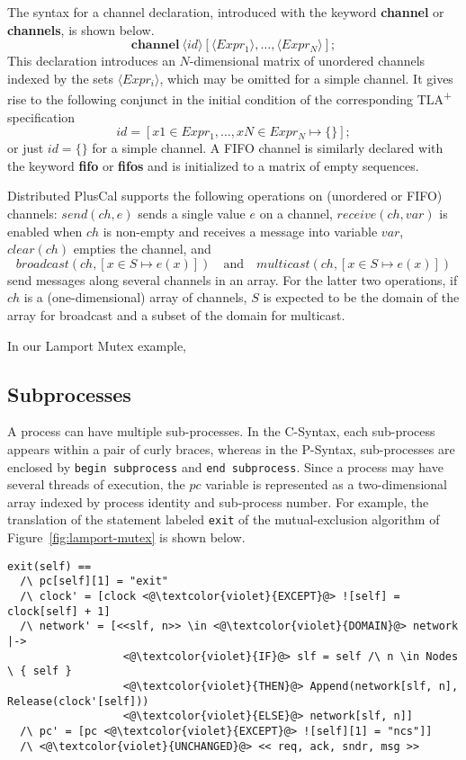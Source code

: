 \documentclass{article}
\newcommand{\tlaplus}{TLA\textsuperscript{+}\xspace}
\newcommand{\keyword}[1]{\textbf{#1}}
\newcommand{\entity}[1]{\ensuremath{\langle}#1\ensuremath{\rangle}}
\begin{document}
The syntax for a channel declaration, introduced with the keyword \keyword{channel} or \keyword{channels}, is shown below.
\[
 \keyword{channel}\ \entity{id}[\entity{Expr_1},\dots,\entity{Expr_N}];
\]
This declaration introduces an $N$-dimensional matrix of unordered channels indexed by the sets $\entity{Expr_i}$, which may be omitted for a simple channel. It gives rise to the following conjunct in the initial condition of the corresponding \tlaplus specification
\[
 id = [x1 \in Expr_1,\dots,xN \in Expr_N \mapsto \{ \}];
\]
or just $id = \{\}$ for a simple channel.
%
A FIFO channel is similarly declared with the keyword \keyword{fifo} or \keyword{fifos} and is initialized to a matrix of empty sequences.

Distributed PlusCal supports the following operations on (unordered or FIFO) channels: $send(ch, e)$ sends a single value $e$ on a channel, $receive(ch, var)$ is enabled when $ch$ is non-empty and receives a message into variable $var$, $clear(ch)$ empties the channel, and
\[ broadcast(ch, [x \in S \mapsto e(x)])
   \quad\textrm{and}\quad
   multicast(ch, [x \in S \mapsto e(x)])
\]
send messages along several channels in an array. For the latter two operations, if $ch$ is a (one-dimensional) array of channels, $S$ is expected to be the domain of the array for broadcast and a subset of the domain for multicast.

In our Lamport Mutex example, 

\subsection{Subprocesses}
\label{subProcess}

A process can have multiple sub-processes.
In the C-Syntax, each sub-process appears within a pair of curly braces, whereas in the P-Syntax, sub-processes are enclosed by \verb|begin subprocess| and \verb|end subprocess|. Since a process may have several threads of execution, the $pc$ variable is represented as a two-dimensional array indexed by process identity and sub-process number. For example, the translation of the statement labeled \verb|exit| of the mutual-exclusion algorithm of Figure~\ref{fig:lamport-mutex} is shown below.

\begin{lstlisting}[language=pluscal,frame = tlrb, numbers=none]  
exit(self) == 
  /\ pc[self][1] = "exit"
  /\ clock' = [clock <@\textcolor{violet}{EXCEPT}@> ![self] = clock[self] + 1]
  /\ network' = [<<slf, n>> \in <@\textcolor{violet}{DOMAIN}@> network |->  
                  <@\textcolor{violet}{IF}@> slf = self /\ n \in Nodes \ { self } 
                  <@\textcolor{violet}{THEN}@> Append(network[slf, n], Release(clock'[self])) 
                  <@\textcolor{violet}{ELSE}@> network[slf, n]]
  /\ pc' = [pc <@\textcolor{violet}{EXCEPT}@> ![self][1] = "ncs"]]
  /\ <@\textcolor{violet}{UNCHANGED}@> << req, ack, sndr, msg >>
\end{lstlisting}
\end{document}
